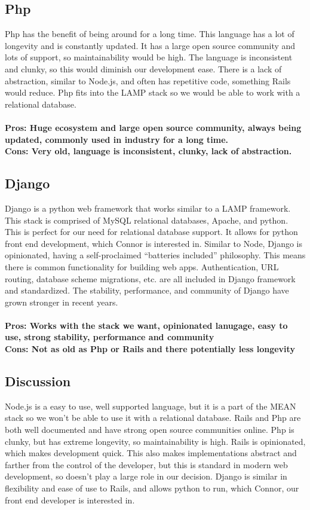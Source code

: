 \documentclass[draftclsnofoot,onecolumn,letterpaper,10pt,compsoc]{IEEEtran}
\begin{document}
			\subsection{Php}
			Php has the benefit of being around for a long time\cite{InfoWorldPhp}.
			This language has a lot of longevity and is constantly updated. It has a large open source community and lots of support, so maintainability would be high\cite{Medium}.
			The language is inconsistent and clunky, so this would diminish our development ease.
			There is a lack of abstraction, similar to Node.js, and often has repetitive code\cite{RailsApps}, something Rails would reduce.
			Php fits into the LAMP stack so we would be able to work with a relational database.
				\\ \\
				\textbf{Pros: Huge ecosystem and large open source community, always being updated, commonly used in industry for a long time.}
				\\
				\textbf{Cons: Very old, language is inconsistent, clunky, lack of abstraction.}

		\subsection{Django}
				Django is a python web framework that works similar to a LAMP framework.
				This stack is comprised of MySQL relational databases, Apache, and python\cite{Bitnami}.
				This is perfect for our need for relational database support. It allows for python front end development, which Connor is interested in.
				Similar to Node, Django is opinionated, having a self-proclaimed “batteries included” philosophy\cite{FullStackPython}.
				This means there is common functionality for building web apps. Authentication, URL routing, database scheme migrations, etc. are all included in Django framework and standardized\cite{FullStackPython}.
				The stability, performance, and community of Django have grown stronger in recent years\cite{FullStackPython}.
				\\ \\
				\textbf{Pros: Works with the stack we want, opinionated lanugage, easy to use, strong stability, performance and community }
				\\
				\textbf{Cons: Not as old as Php or Rails and there potentially less longevity}

				\subsection{Discussion}
				Node.js is a easy to use, well supported language, but it is a part of the MEAN stack so we won’t be able to use it with a relational database.
				Rails and Php are both well documented and have strong open source communities online.
				Php is clunky, but has extreme longevity, so maintainability is high.
				Rails is opinionated, which makes development quick.
				This also makes implementations abstract and farther from the control of the developer, but this is standard in modern web development, so doesn't play a large role in our decision.
				Django is similar in flexibility and ease of use to Rails, and allows python to run, which Connor, our front end developer is interested in.
\end{document}
